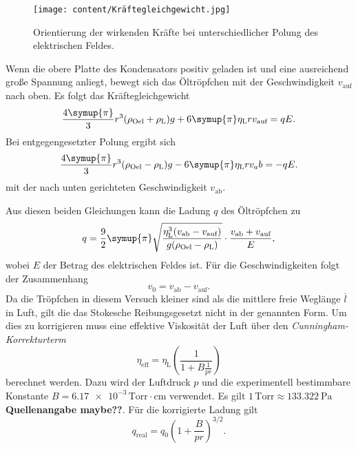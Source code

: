 \begin{figure}
    \centering
    \texttt{[image: content/Kräftegleichgewicht.jpg]}
    \label{fig:Kraeftegleichgewicht}
    \caption{Orientierung der wirkenden Kräfte bei unterschiedlicher Polung des elektrischen Feldes. \cite{v503}}
\end{figure}

Wenn die obere Platte des Kondensators positiv geladen ist und eine ausreichend große Spannung anliegt, bewegt sich das Öltröpfchen mit der Geschwindigkeit $v_\text{auf}$
nach oben. 
Es folgt das Kräftegleichgewicht
\begin{equation*}
    \label{eqn:Kraefte_v_auf}
    \frac{4\symup{\pi}}{3}r^3(\rho_\text{Oel} + \rho_\text{L})g + 6 \symup{\pi} \eta_\text{L}r v_\text{auf} = qE.
\end{equation*}
Bei entgegengesetzter Polung ergibt sich 
\begin{equation*}
    \label{eqn:Kraefte_v_auf}
    \frac{4\symup{\pi}}{3}r^3(\rho_\text{Oel}- \rho_\text{L})g - 6 \symup{\pi} \eta_\text{L}r v_ab = -qE.
\end{equation*}
mit der nach unten gerichteten Geschwindigkeit $v_\text{ab}$.

Aus diesen beiden Gleichungen kann die Ladung $q$ des Öltröpfchen zu 
\begin{equation}
    \label{eqn:q}
    q = \frac{9}{2} \symup{\pi} \sqrt{\frac{\eta_\text{L}^3(v_\text{ab} - v_\text{auf})}{g(\rho_\text{Oel}- \rho_\text{L})}} \cdot \frac{v_\text{ab} + v_\text{auf}}{E},
\end{equation}
wobei $E$ der Betrag des elektrischen Feldes ist. Für die Geschwindigkeiten folgt der Zusammenhang
\begin{equation}
    \label{eqn:v_0}
    v_0 = v_\text{ab} - v_\text{auf}.
\end{equation}    
Da die Tröpfchen in diesem Versuch kleiner sind als die mittlere freie Weglänge $\overline{l}$ in Luft, gilt die das Stokesche Reibungsgesetzt nicht in der genannten Form.
Um dies zu korrigieren muss eine effektive Viskosität der Luft über den \textit{Cunningham-Korrekturterm}
\begin{equation}
    \label{eqn:n_eff}
    \eta_\text{eff} = \eta_\text{L} \left(\frac{1}{1 + B \frac{1}{pr}}\right)
\end{equation}
berechnet werden. Dazu wird der Luftdruck $p$ und die experimentell bestimmbare Konstante $B =  \num{6.17e-3}\, \text{Torr}\cdot\unit{\centi\metre}$ \cite{v503} verwendet.
Es gilt $1\,\text{Torr} \approx \qty{133.322}{\pascal}$ \textbf{Quellenangabe maybe??}.
Für die korrigierte Ladung gilt
\begin{equation}
    \label{eqn:q_korrigiert}
    q_\text{real} = q_0 \left(1+ \frac{B}{pr}\right)^{3/2}.
\end{equation}
